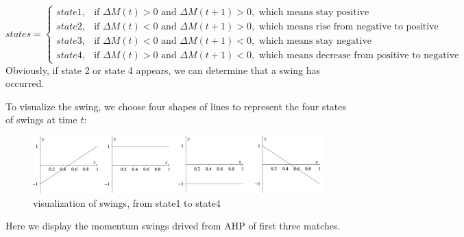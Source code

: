 $$states=\begin{cases}
    state1, &\text{if } \Delta M(t)>0 \text{ and } \Delta M(t+1)>0, \text{ which means stay positive}\\
    state2, &\text{if } \Delta M(t)<0 \text{ and } \Delta M(t+1)>0, \text{ which means rise from negative to positive}\\
    state3, &\text{if } \Delta M(t)<0 \text{ and } \Delta M(t+1)<0, \text{ which means stay negative}\\
    state4, &\text{if } \Delta M(t)>0 \text{ and } \Delta M(t+1)<0, \text{ which means decrease from positive to negative}
\end{cases}$$
Obviously, if state 2 or state 4 appears, we can determine that a swing has occurred. 

To visualize the swing, we choose four shapes of lines to represent the four states of swings at time $t$:

\begin{figure}[H]
    \centering
        \includegraphics[width=\linewidth]{mainmatter/imgs/states.jpg}
    \caption{visualization of swings, from state1 to state4}
    \label{fig:states}
\end{figure}

Here we display the momentum swings drived from AHP of first three matches.

